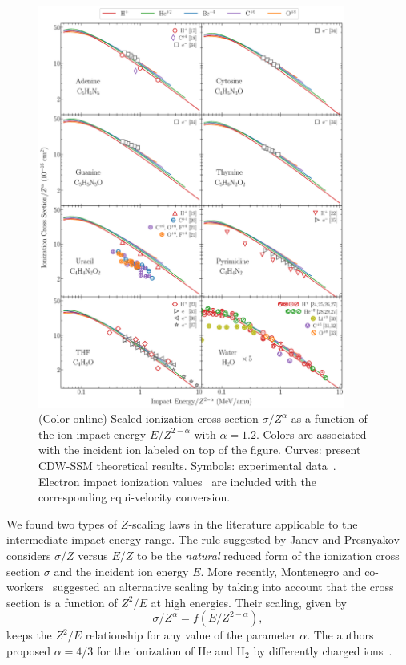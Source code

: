 \documentclass[10pt,showpacs,showkeys,twocolumn]{revtex4-1}
\begin{document}
\begin{figure}[!htb]
\centering
\includegraphics[width=0.9\textwidth]{zscale_alpha-wref.eps}
\caption{(Color online) Scaled ionization cross section $\sigma/Z^{\alpha}$ 
as a function of the ion impact energy $E/Z^{2-\alpha}$ with $\alpha=1.2$. 
Colors are associated with the incident ion labeled on top of the figure. 
Curves: present CDW-SSM theoretical results. 
Symbols: experimental data~\cite{itoh2013,iriki2011,wolff2014,wang2016,
tribedi2019,agnihotri2012,agnihotri2013,Luna2007,Rudd86,pRudd85,
toburen80,Ohsawa05,Bhattacharjee17,Luna_Li_water,DalCappello2009,
Tribedi_O_water}. Electron impact ionization values~\cite{rahman2016,
bug2017,wolf2019,fuss2009} are included with the corresponding 
equi-velocity conversion.}
\label{fig:zreduced}
\end{figure} 

We found two types of $Z$-scaling laws in the literature applicable 
to the intermediate impact energy range. The rule suggested by Janev 
and Presnyakov~\cite{janev1980} considers $\sigma/Z$ versus $E/Z$ to be 
the \textit{natural} reduced form of the ionization cross section 
$\sigma$ and the incident ion energy $E$. More recently, Montenegro and 
co-workers~\cite{dubois13,montenegro_pra13} suggested an alternative 
scaling by taking into account that the cross section is a function of 
$Z^2/E$ at high energies. Their scaling, given by 
\begin{equation}
 \sigma/Z^{\alpha}=f(E/Z^{2-\alpha}),
\label{eq:Montenegro}
\end{equation}
keeps the $Z^2/E$ relationship for any value of the parameter 
$\alpha$. The authors proposed $\alpha=4/3$ for the ionization of He and 
H$_2$ by differently charged ions~\cite{dubois13}. 
 
\end{document}
